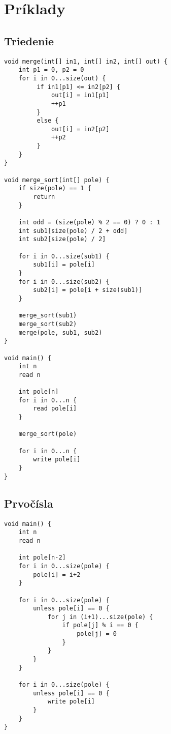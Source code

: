 \documentclass{article}
\begin{document}
        
        
\section{Príklady}

    \subsection{Triedenie}
        \begin{lstlisting}
void merge(int[] in1, int[] in2, int[] out) {
    int p1 = 0, p2 = 0
    for i in 0...size(out) {
         if in1[p1] <= in2[p2] {
             out[i] = in1[p1]
             ++p1
         }
         else {
             out[i] = in2[p2]
             ++p2
         }
    }
}

void merge_sort(int[] pole) {
    if size(pole) == 1 {
        return
    }
    
    int odd = (size(pole) % 2 == 0) ? 0 : 1
    int sub1[size(pole) / 2 + odd]
    int sub2[size(pole) / 2]
    
    for i in 0...size(sub1) {
        sub1[i] = pole[i]
    }    
    for i in 0...size(sub2) {
        sub2[i] = pole[i + size(sub1)]
    }
    
    merge_sort(sub1)
    merge_sort(sub2)
    merge(pole, sub1, sub2)
}

void main() {
    int n
    read n
    
    int pole[n]
    for i in 0...n {
        read pole[i]
    }
    
    merge_sort(pole)
    
    for i in 0...n {
        write pole[i]
    }
}

        \end{lstlisting}

    \subsection{Prvočísla}
        \begin{lstlisting}
void main() {
    int n
    read n

    int pole[n-2]
    for i in 0...size(pole) {
        pole[i] = i+2
    }
    
    for i in 0...size(pole) {
        unless pole[i] == 0 {
            for j in (i+1)...size(pole) {
                if pole[j] % i == 0 {
                    pole[j] = 0
                }
            }
        }
    }
    
    for i in 0...size(pole) {
        unless pole[i] == 0 {
            write pole[i]
        }
    }
}

        \end{lstlisting}
\end{document}
